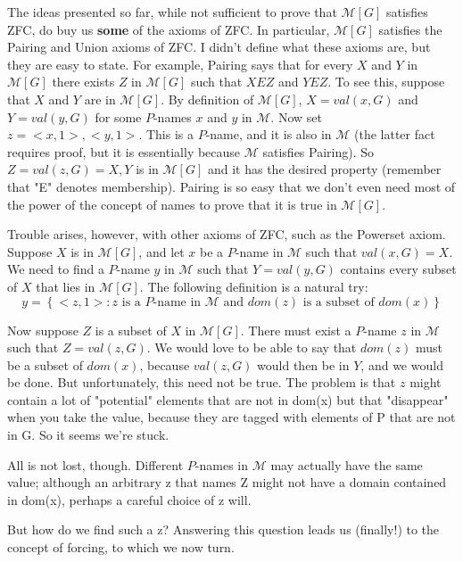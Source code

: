 \documentclass[10pt]{article}
\theoremstyle{definition}
\begin{document}
The ideas presented so far, while not sufficient to prove that $\mathcal{M}[G]$
satisfies ZFC, do buy us \textbf{some} of the axioms of ZFC.  In particular, $\mathcal{M}[G]$
satisfies the Pairing and Union axioms of ZFC.  I didn't define what these
axioms are, but they are easy to state.  For example, Pairing says that for
every $X$ and $Y$ in $\mathcal{M}[G]$ there exists $Z$ in $\mathcal{M}[G]$ such that $X E Z$ and $Y E Z$.  To
see this, suppose that $X$ and $Y$ are in $\mathcal{M}[G]$.  By definition of $\mathcal{M}[G]$,
$X = val(x,G)$ and $Y = val(y,G)$ for some $P$-names $x$ and $y$ in $\mathcal M$.  Now set
$z = {<x,1>, <y,1>}$.  This is a $P$-name, and it is also in $\mathcal{M}$ (the latter
fact requires proof, but it is essentially because $\mathcal{M}$ satisfies Pairing).
So $Z = val(z,G) = {X,Y}$ is in $\mathcal{M}[G]$ and it has the desired property (remember
that "E" denotes membership).  Pairing is so easy that we don't even need
most of the power of the concept of names to prove that it is true in $\mathcal{M}[G]$.

Trouble arises, however, with other axioms of ZFC, such as the Powerset
axiom.  Suppose $X$ is in $\mathcal{M}[G]$, and let $x$ be a $P$-name in $\mathcal{M}$ such that
$val(x,G) = X$.  We need to find a $P$-name $y$ in $\mathcal{M}$ such that $Y = val(y,G)$
contains every subset of $X$ that lies in $\mathcal{M}[G]$.  The following definition
is a natural try:
$$y = \left\{<z,1> : z\text{ is a }P\text{-name in }\mathcal{M}\text{ and }dom(z)\text{ is a subset of }dom(x)\right\}$$

Now suppose $Z$ is a subset of $X$ in $\mathcal{M}[G]$.  There must exist a $P$-name $z$ in $\mathcal M$
such that $Z = val(z,G)$.  We would love to be able to say that $dom(z)$ must be
a subset of $dom(x)$, because $val(z,G)$ would then be in $Y$, and we would be
done.  But unfortunately, this need not be true.  The problem is that $z$
might contain a lot of "potential" elements that are not in dom(x) but that
"disappear" when you take the value, because they are tagged with elements
of P that are not in G.  So it seems we're stuck.

All is not lost, though.  Different $P$-names in $\mathcal{M}$ may actually have the same
value; although an arbitrary z that names Z might not have a domain
contained in dom(x), perhaps a careful choice of z will.

But how do we find such a z?  Answering this question leads us (finally!) to
the concept of forcing, to which we now turn.
\end{document}

